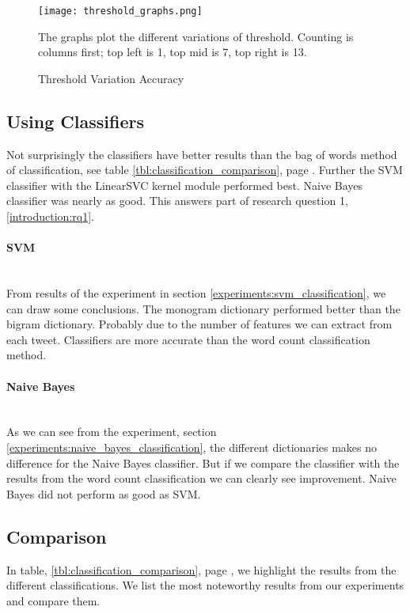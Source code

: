 \begin{figure}[htb]
    \centering
    \texttt{[image: threshold\_graphs.png]}
    \label{fig:threshold_graphs}
    \caption{Threshold Variation Accuracy}
The graphs plot the different variations of threshold. Counting is
columns first; top left is 1, top mid is 7, top right is 13.
\end{figure}

\subsection{Using Classifiers}
Not surprisingly the classifiers have better results than the bag of words
method of classification, see table \ref{tbl:classification_comparison}, page
\pageref{tbl:classification_comparison}. Further the SVM classifier with the LinearSVC kernel
module performed best. Naive Bayes classifier was nearly as good. This answers
part of research question 1, \ref{introduction:rq1}.

\paragraph{SVM}\label{results:svm_classification}
\hspace{0pt}\\
From results of the experiment in section \ref{experiments:svm_classification},
we can draw some conclusions. The monogram dictionary performed
better than the bigram dictionary. Probably due to the number of features we
can extract from each tweet. Classifiers are more accurate than the word
count classification method.

\paragraph{Naive Bayes}\label{results:naive_bayes_classification}
\hspace{0pt}\\
As we can see from the experiment, section
\ref{experiments:naive_bayes_classification}, the different dictionaries makes
no difference for the Naive Bayes classifier. But if we compare the classifier
with the results from the word count classification we can clearly see
improvement. Naive Bayes did not perform as good as SVM. 

\subsection{Comparison}\label{results:comparison}
In table, \ref{tbl:classification_comparison}, page
\pageref{tbl:classification_comparison}, we highlight the
results from the different classifications. We list the most noteworthy results
from our experiments and compare them.

